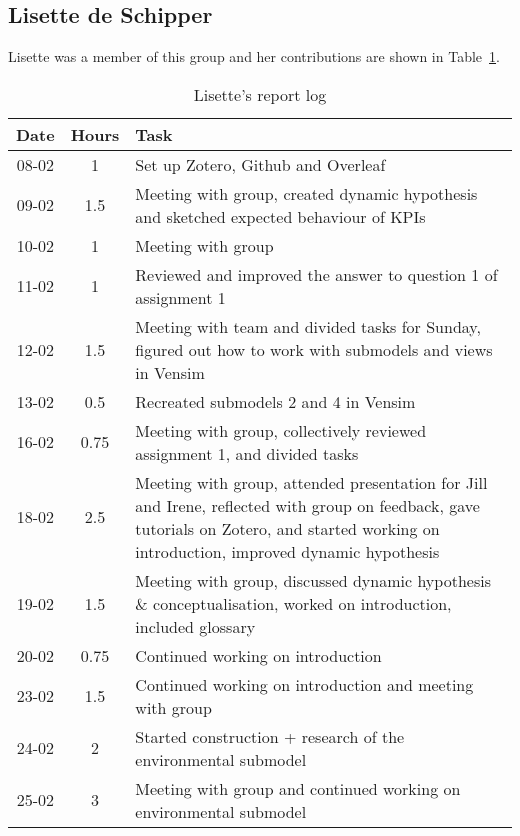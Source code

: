 \subsection{Lisette de Schipper}
Lisette was a member of this group and her contributions are shown in Table~\ref{tab:lisette_log}. 
\begin{longtable}[c]{c|c|m{35em}}
\caption{Lisette's report log}
\label{tab:lisette_log}\\
\textbf{Date}& \textbf{Hours} & \textbf{Task} \\
\hline
\endfirsthead
%
\endhead
%
08-02 & 1 & Set up Zotero, Github and Overleaf \\
09-02 & 1.5 & Meeting with group, created dynamic hypothesis and sketched expected behaviour of KPIs\\
10-02 & 1 & Meeting with group \\
11-02 & 1 & Reviewed and improved the answer to question 1 of assignment 1 \\
12-02 & 1.5 & Meeting with team and divided tasks for Sunday, figured out how to work with submodels and views in Vensim \\
13-02 & 0.5 & Recreated submodels 2 and 4 in Vensim \\
16-02 & 0.75 & Meeting with group, collectively reviewed assignment 1, and divided tasks \\
18-02 & 2.5 & Meeting with group, attended presentation for Jill and Irene, reflected with group on feedback, gave tutorials on Zotero, and started working on introduction, improved dynamic hypothesis \\
19-02 & 1.5 & Meeting with group, discussed dynamic hypothesis \& conceptualisation, worked on introduction, included glossary \\
20-02 & 0.75 & Continued working on introduction \\
23-02 & 1.5 & Continued working on introduction and meeting with group \\
24-02 & 2 & Started construction + research of the environmental submodel \\
25-02 & 3 & Meeting with group and continued working on environmental submodel \\
\end{longtable}

